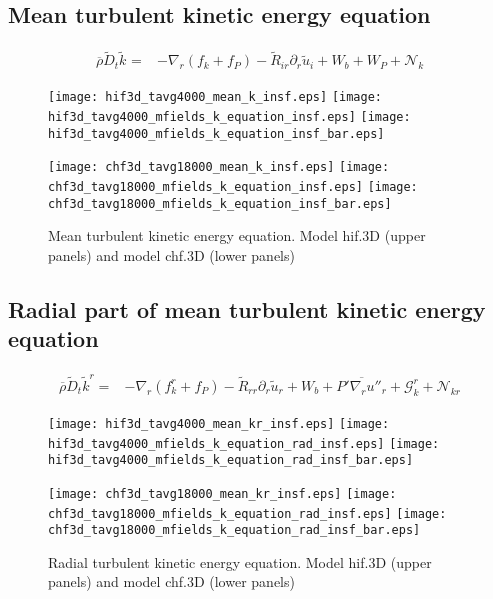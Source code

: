 \documentclass[10pt,paper=a4]{report}
\newcommand{\eht}{\overline}
\newcommand{\fht}{\widetilde}
\newcommand{\fav}{\widetilde}
\newcommand{\av}{\overline}
\begin{document}
\newpage

\subsection{Mean turbulent kinetic energy equation}

\begin{align}
\av{\rho} \fav{D}_t \fav{k}^{ } = & -\nabla_r ( f_k +  f_P ) - \fht{R}_{ir}\partial_r \fht{u}_i + W_b + W_P + {\mathcal N_k}   
\end{align}

\begin{figure}[!h]
\centerline{
\texttt{[image: hif3d\_tavg4000\_mean\_k\_insf.eps]}
\texttt{[image: hif3d\_tavg4000\_mfields\_k\_equation\_insf.eps]}
\texttt{[image: hif3d\_tavg4000\_mfields\_k\_equation\_insf\_bar.eps]}}

\centerline{
\texttt{[image: chf3d\_tavg18000\_mean\_k\_insf.eps]}
\texttt{[image: chf3d\_tavg18000\_mfields\_k\_equation\_insf.eps]}
\texttt{[image: chf3d\_tavg18000\_mfields\_k\_equation\_insf\_bar.eps]}}

\caption{Mean turbulent kinetic energy equation. Model {\sf hif.3D} (upper panels) and model {\sf chf.3D} (lower panels)}
\end{figure}

\newpage

\subsection{Radial part of mean turbulent kinetic energy equation}

\begin{align}
\av{\rho} \fav{D}_t \fav{k}^r =  &  -\nabla_r  ( f_k^r + f_P )  - \fht{R}_{rr}\partial_r \fht{u}_r + W_b  + \eht{P'\nabla_r u''_r} + {\mathcal G_k^r} + {\mathcal N_{kr}} 
\end{align}

\begin{figure}[!h]

\centerline{
\texttt{[image: hif3d\_tavg4000\_mean\_kr\_insf.eps]}
\texttt{[image: hif3d\_tavg4000\_mfields\_k\_equation\_rad\_insf.eps]}
\texttt{[image: hif3d\_tavg4000\_mfields\_k\_equation\_rad\_insf\_bar.eps]}}

\centerline{
\texttt{[image: chf3d\_tavg18000\_mean\_kr\_insf.eps]}
\texttt{[image: chf3d\_tavg18000\_mfields\_k\_equation\_rad\_insf.eps]}
\texttt{[image: chf3d\_tavg18000\_mfields\_k\_equation\_rad\_insf\_bar.eps]}}

\caption{Radial turbulent kinetic energy equation. Model {\sf hif.3D} (upper panels) and model {\sf chf.3D} (lower panels)}
\end{figure}
\end{document}
